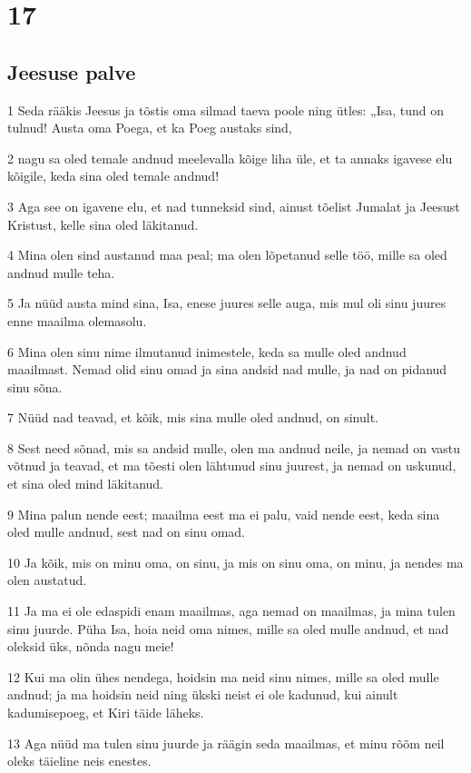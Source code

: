 \chapter{17}

\section*{Jeesuse palve}

\par 1 Seda rääkis Jeesus ja tõstis oma silmad taeva poole ning ütles: „Isa, tund on tulnud! Austa oma Poega, et ka Poeg austaks sind,
\par 2 nagu sa oled temale andnud meelevalla kõige liha üle, et ta annaks igavese elu kõigile, keda sina oled temale andnud!
\par 3 Aga see on igavene elu, et nad tunneksid sind, ainust tõelist Jumalat ja Jeesust Kristust, kelle sina oled läkitanud.
\par 4 Mina olen sind austanud maa peal; ma olen lõpetanud selle töö, mille sa oled andnud mulle teha.
\par 5 Ja nüüd austa mind sina, Isa, enese juures selle auga, mis mul oli sinu juures enne maailma olemasolu.
\par 6 Mina olen sinu nime ilmutanud inimestele, keda sa mulle oled andnud maailmast. Nemad olid sinu omad ja sina andsid nad mulle, ja nad on pidanud sinu sõna.
\par 7 Nüüd nad teavad, et kõik, mis sina mulle oled andnud, on sinult.
\par 8 Sest need sõnad, mis sa andsid mulle, olen ma andnud neile, ja nemad on vastu võtnud ja teavad, et ma tõesti olen lähtunud sinu juurest, ja nemad on uskunud, et sina oled mind läkitanud.
\par 9 Mina palun nende eest; maailma eest ma ei palu, vaid nende eest, keda sina oled mulle andnud, sest nad on sinu omad.
\par 10 Ja kõik, mis on minu oma, on sinu, ja mis on sinu oma, on minu, ja nendes ma olen austatud.
\par 11 Ja ma ei ole edaspidi enam maailmas, aga nemad on maailmas, ja mina tulen sinu juurde. Püha Isa, hoia neid oma nimes, mille sa oled mulle andnud, et nad oleksid üks, nõnda nagu meie!
\par 12 Kui ma olin ühes nendega, hoidsin ma neid sinu nimes, mille sa oled mulle andnud; ja ma hoidsin neid ning ükski neist ei ole kadunud, kui ainult kadumisepoeg, et Kiri täide läheks.
\par 13 Aga nüüd ma tulen sinu juurde ja räägin seda maailmas, et minu rõõm neil oleks täieline neis enestes.
